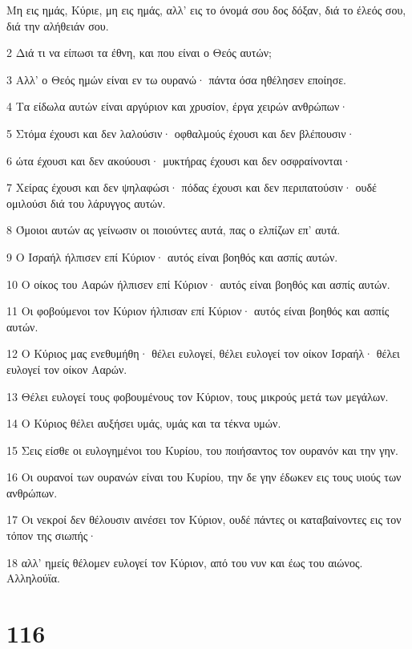 \par Μη εις ημάς, Κύριε, μη εις ημάς, αλλ' εις το όνομά σου δος δόξαν, διά το έλεός σου, διά την αλήθειάν σου.
\par 2 Διά τι να είπωσι τα έθνη, και που είναι ο Θεός αυτών;
\par 3 Αλλ' ο Θεός ημών είναι εν τω ουρανώ· πάντα όσα ηθέλησεν εποίησε.
\par 4 Τα είδωλα αυτών είναι αργύριον και χρυσίον, έργα χειρών ανθρώπων·
\par 5 Στόμα έχουσι και δεν λαλούσιν· οφθαλμούς έχουσι και δεν βλέπουσιν·
\par 6 ώτα έχουσι και δεν ακούουσι· μυκτήρας έχουσι και δεν οσφραίνονται·
\par 7 Χείρας έχουσι και δεν ψηλαφώσι· πόδας έχουσι και δεν περιπατούσιν· ουδέ ομιλούσι διά του λάρυγγος αυτών.
\par 8 Όμοιοι αυτών ας γείνωσιν οι ποιούντες αυτά, πας ο ελπίζων επ' αυτά.
\par 9 Ο Ισραήλ ήλπισεν επί Κύριον· αυτός είναι βοηθός και ασπίς αυτών.
\par 10 Ο οίκος του Ααρών ήλπισεν επί Κύριον· αυτός είναι βοηθός και ασπίς αυτών.
\par 11 Οι φοβούμενοι τον Κύριον ήλπισαν επί Κύριον· αυτός είναι βοηθός και ασπίς αυτών.
\par 12 Ο Κύριος μας ενεθυμήθη· θέλει ευλογεί, θέλει ευλογεί τον οίκον Ισραήλ· θέλει ευλογεί τον οίκον Ααρών.
\par 13 Θέλει ευλογεί τους φοβουμένους τον Κύριον, τους μικρούς μετά των μεγάλων.
\par 14 Ο Κύριος θέλει αυξήσει υμάς, υμάς και τα τέκνα υμών.
\par 15 Σεις είσθε οι ευλογημένοι του Κυρίου, του ποιήσαντος τον ουρανόν και την γην.
\par 16 Οι ουρανοί των ουρανών είναι του Κυρίου, την δε γην έδωκεν εις τους υιούς των ανθρώπων.
\par 17 Οι νεκροί δεν θέλουσιν αινέσει τον Κύριον, ουδέ πάντες οι καταβαίνοντες εις τον τόπον της σιωπής·
\par 18 αλλ' ημείς θέλομεν ευλογεί τον Κύριον, από του νυν και έως του αιώνος. Αλληλούϊα.

\chapter{116}

